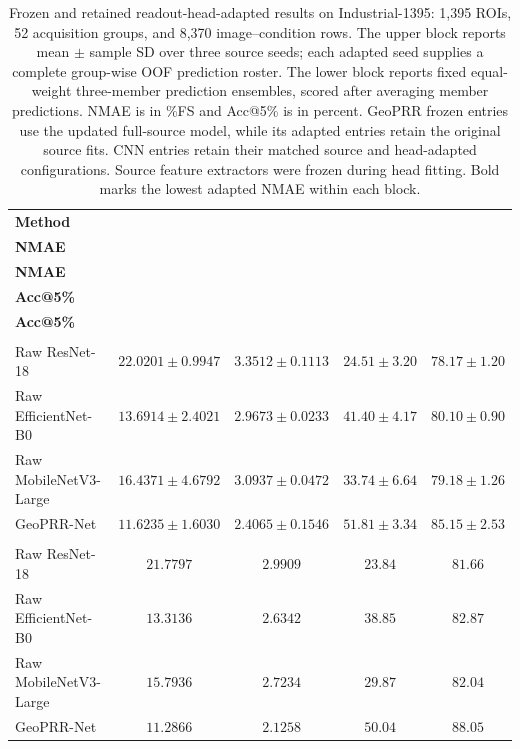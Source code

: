 \documentclass[electronics,article,submit,oneauthor]{Definitions/mdpi}
\newcommand{\modelname}{GeoPRR-Net\xspace}
\begin{document}
\begin{table}[H]
\caption{Frozen and retained readout-head-adapted results on Industrial-1395: 1,395 ROIs, 52 acquisition groups, and 8,370 image--condition rows. The upper block reports mean $\pm$ sample SD over three source seeds; each adapted seed supplies a complete group-wise OOF prediction roster. The lower block reports fixed equal-weight three-member prediction ensembles, scored after averaging member predictions. NMAE is in \%FS and Acc@5\% is in percent. GeoPRR frozen entries use the updated full-source model, while its adapted entries retain the original source fits. CNN entries retain their matched source and head-adapted configurations. Source feature extractors were frozen during head fitting. Bold marks the lowest adapted NMAE within each block.}
\label{tab:industrial}
\centering
\small
\begin{tabularx}{\textwidth}{@{}>{\raggedright\arraybackslash}Xcccc@{}}
\toprule
\textbf{Method} & \shortstack{\textbf{Frozen}\\\textbf{NMAE}} & \shortstack{\textbf{Head-adapted}\\\textbf{NMAE}} & \shortstack{\textbf{Frozen}\\\textbf{Acc@5\%}} & \shortstack{\textbf{Head-adapted}\\\textbf{Acc@5\%}} \\
\midrule
\multicolumn{5}{@{}l}{\textit{Three-seed mean $\pm$ sample SD}} \\
Raw ResNet-18 & $22.0201\pm0.9947$ & $3.3512\pm0.1113$ & $24.51\pm3.20$ & $78.17\pm1.20$ \\
Raw EfficientNet-B0 & $13.6914\pm2.4021$ & $2.9673\pm0.0233$ & $41.40\pm4.17$ & $80.10\pm0.90$ \\
Raw MobileNetV3-Large & $16.4371\pm4.6792$ & $3.0937\pm0.0472$ & $33.74\pm6.64$ & $79.18\pm1.26$ \\
\modelname & $11.6235\pm1.6030$ & $\mathbf{2.4065\pm0.1546}$ & $51.81\pm3.34$ & $85.15\pm2.53$ \\
\midrule
\multicolumn{5}{@{}l}{\textit{Three-member equal-weight ensembles}} \\
Raw ResNet-18 & $21.7797$ & $2.9909$ & $23.84$ & $81.66$ \\
Raw EfficientNet-B0 & $13.3136$ & $2.6342$ & $38.85$ & $82.87$ \\
Raw MobileNetV3-Large & $15.7936$ & $2.7234$ & $29.87$ & $82.04$ \\
\modelname & $11.2866$ & $\mathbf{2.1258}$ & $50.04$ & $88.05$ \\
\bottomrule
\end{tabularx}
\end{table}
\end{document}
